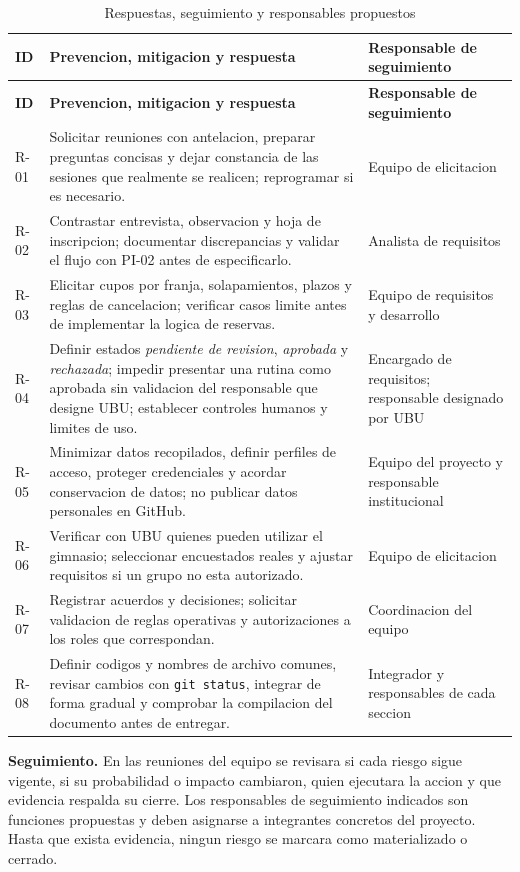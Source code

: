 \begingroup
\small
\renewcommand{\arraystretch}{1.2}
\begin{longtable}{|p{1.0cm}|p{9.0cm}|p{3.05cm}|}
\caption{Respuestas, seguimiento y responsables propuestos}\label{tab:respuesta-riesgos}\\\hline
\textbf{ID} & \textbf{Prevencion, mitigacion y respuesta} & \textbf{Responsable de seguimiento} \\ \hline
\endfirsthead
\hline \textbf{ID} & \textbf{Prevencion, mitigacion y respuesta} & \textbf{Responsable de seguimiento} \\ \hline
\endhead
R-01 & Solicitar reuniones con antelacion, preparar preguntas concisas y dejar constancia de las sesiones que realmente se realicen; reprogramar si es necesario. & Equipo de elicitacion \\ \hline
R-02 & Contrastar entrevista, observacion y hoja de inscripcion; documentar discrepancias y validar el flujo con PI-02 antes de especificarlo. & Analista de requisitos \\ \hline
R-03 & Elicitar cupos por franja, solapamientos, plazos y reglas de cancelacion; verificar casos limite antes de implementar la logica de reservas. & Equipo de requisitos y desarrollo \\ \hline
R-04 & Definir estados \emph{pendiente de revision}, \emph{aprobada} y \emph{rechazada}; impedir presentar una rutina como aprobada sin validacion del responsable que designe UBU; establecer controles humanos y limites de uso. & Encargado de requisitos; responsable designado por UBU \\ \hline
R-05 & Minimizar datos recopilados, definir perfiles de acceso, proteger credenciales y acordar conservacion de datos; no publicar datos personales en GitHub. & Equipo del proyecto y responsable institucional \\ \hline
R-06 & Verificar con UBU quienes pueden utilizar el gimnasio; seleccionar encuestados reales y ajustar requisitos si un grupo no esta autorizado. & Equipo de elicitacion \\ \hline
R-07 & Registrar acuerdos y decisiones; solicitar validacion de reglas operativas y autorizaciones a los roles que correspondan. & Coordinacion del equipo \\ \hline
R-08 & Definir codigos y nombres de archivo comunes, revisar cambios con \texttt{git status}, integrar de forma gradual y comprobar la compilacion del documento antes de entregar. & Integrador y responsables de cada seccion \\ \hline
\end{longtable}
\endgroup

\noindent\textbf{Seguimiento.} En las reuniones del equipo se revisara si cada riesgo sigue vigente, si su probabilidad o impacto cambiaron, quien ejecutara la accion y que evidencia respalda su cierre. Los responsables de seguimiento indicados son funciones propuestas y deben asignarse a integrantes concretos del proyecto. Hasta que exista evidencia, ningun riesgo se marcara como materializado o cerrado.
